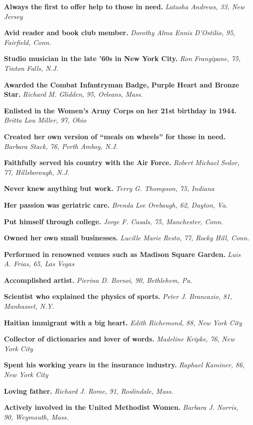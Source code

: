 \textbf{Always the first to offer help to those in need.} \emph{Latasha
Andrews, 33, New Jersey}

\textbf{Avid reader and book club member.} \emph{Dorothy Alma Ennis
D'Ostilio, 95, Fairfield, Conn.}

\textbf{Studio musician in the late '60s in New York City.} \emph{Ron
Frangipane, 75, Tinton Falls, N.J.}

\textbf{Awarded the Combat Infantryman Badge, Purple Heart and Bronze
Star.} \emph{Richard M. Glidden, 95, Orleans, Mass.}

\textbf{Enlisted in the Women's Army Corps on her 21st birthday in
1944.} \emph{Britta Lou Miller, 97, Ohio}

\textbf{Created her own version of ``meals on wheels'' for those in
need.} \emph{Barbara Stack, 76, Perth Amboy, N.J.}

\textbf{Faithfully served his country with the Air Force.} \emph{Robert
Michael Sedor, 77, Hillsborough, N.J.}

\textbf{Never knew anything but work.} \emph{Terry G. Thompson, 75,
Indiana}

\textbf{Her passion was geriatric care.} \emph{Brenda Lee Orebaugh, 62,
Dayton, Va.}

\textbf{Put himself through college.} \emph{Jorge F. Casals, 75,
Manchester, Conn.}

\textbf{Owned her own small businesses.} \emph{Lucille Marie Resto, 77,
Rocky Hill, Conn.}

\textbf{Performed in renowned venues such as Madison Square Garden.}
\emph{Luis A. Frias, 65, Las Vegas}

\textbf{Accomplished artist.} \emph{Pierina D. Borsoi, 90, Bethlehem,
Pa.}

\textbf{Scientist who explained the physics of sports.} \emph{Peter J.
Brancazio, 81, Manhasset, N.Y.}

\textbf{Haitian immigrant with a big heart.} \emph{Edith Richemond, 88,
New York City}

\textbf{Collector of dictionaries and lover of words.} \emph{Madeline
Kripke, 76, New York City}

\textbf{Spent his working years in the insurance industry.}
\emph{Raphael Kaminer, 86, New York City}

\textbf{Loving father.} \emph{Richard J. Rome, 91, Roslindale, Mass.}

\textbf{Actively involved in the United Methodist Women.} \emph{Barbara
J. Norris, 90, Weymouth, Mass.}


